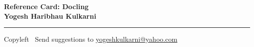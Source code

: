 
\graphicspath{{images/}}

\footnotesize


\begin{center}
\Large{\textbf{Reference Card: Docling\\ Yogesh Haribhau Kulkarni}}  
\end{center}

\begin{multicols}{2}

% 
\end{multicols}

\rule{\linewidth}{0.25pt}
\scriptsize
Copyleft \textcopyleft\  Send suggestions to 
\href{http://www.yogeshkulkarni.com}{yogeshkulkarni@yahoo.com}


